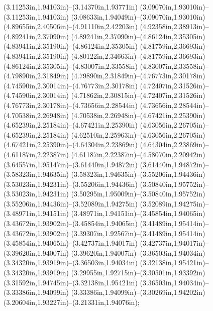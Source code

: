 (3.11253in,1.94103in)--(3.14370in,1.93771in) (3.09070in,1.93010in)--(3.11253in,1.94103in) (3.08633in,1.94049in)--(3.09070in,1.93010in) (4.89655in,2.40506in)--(4.91110in,2.42203in) (4.92358in,2.38913in)--(4.89241in,2.37090in) (4.89241in,2.37090in)--(4.86124in,2.35305in) (4.83941in,2.35190in)--(4.86124in,2.35305in) (4.81759in,2.36693in)--(4.83941in,2.35190in) (4.80122in,2.34663in)--(4.81759in,2.36693in) (4.86124in,2.35305in)--(4.83007in,2.33558in) (4.83007in,2.33558in)--(4.79890in,2.31849in) (4.79890in,2.31849in)--(4.76773in,2.30178in) (4.74590in,2.30014in)--(4.76773in,2.30178in) (4.72407in,2.31526in)--(4.74590in,2.30014in) (4.71862in,2.30815in)--(4.72407in,2.31526in) (4.76773in,2.30178in)--(4.73656in,2.28544in) (4.73656in,2.28544in)--(4.70538in,2.26948in) (4.70538in,2.26948in)--(4.67421in,2.25390in) (4.65239in,2.25184in)--(4.67421in,2.25390in) (4.63056in,2.26705in)--(4.65239in,2.25184in) (4.62510in,2.25963in)--(4.63056in,2.26705in) (4.67421in,2.25390in)--(4.64304in,2.23869in) (4.64304in,2.23869in)--(4.61187in,2.22387in) (4.61187in,2.22387in)--(4.58070in,2.20942in) (3.64557in,1.95147in)--(3.61440in,1.94872in) (3.61440in,1.94872in)--(3.58323in,1.94635in) (3.58323in,1.94635in)--(3.55206in,1.94436in) (3.53023in,1.94231in)--(3.55206in,1.94436in) (3.50840in,1.95752in)--(3.53023in,1.94231in) (3.50295in,1.95009in)--(3.50840in,1.95752in) (3.55206in,1.94436in)--(3.52089in,1.94275in) (3.52089in,1.94275in)--(3.48971in,1.94151in) (3.48971in,1.94151in)--(3.45854in,1.94065in) (3.43672in,1.93902in)--(3.45854in,1.94065in) (3.41489in,1.95414in)--(3.43672in,1.93902in) (3.39307in,1.92567in)--(3.41489in,1.95414in) (3.45854in,1.94065in)--(3.42737in,1.94017in) (3.42737in,1.94017in)--(3.39620in,1.94007in) (3.39620in,1.94007in)--(3.36503in,1.94034in) (3.34320in,1.93919in)--(3.36503in,1.94034in) (3.32138in,1.95421in)--(3.34320in,1.93919in) (3.29955in,1.92715in)--(3.30501in,1.93392in) (3.31592in,1.94745in)--(3.32138in,1.95421in) (3.36503in,1.94034in)--(3.33386in,1.94099in) (3.33386in,1.94099in)--(3.30269in,1.94202in) (3.20604in,1.93227in)--(3.21331in,1.94076in);
